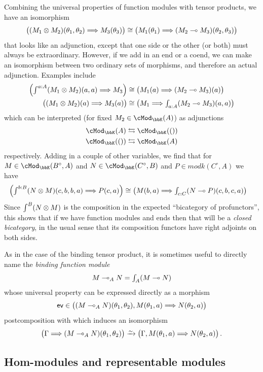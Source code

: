 \documentclass{amsart}
\newcommand{\K}{\bbK}
\let\mod\cMod
\def\modk{\mod_\K}
\renewcommand{\o}{^{\circ}}
\let\vdash\Longrightarrow
\let\mto\vdash    %
\def\mhom#1#2{\left( #1 \vphantom{\big|}\mto #2 \right)}
\newcommand{\coend}{\begingroup\textstyle\int\endgroup}
\newcommand{\tend}{\begingroup\textstyle\int\endgroup}
\newcommand{\ev}{\mathsf{ev}}
\begin{document}
Combining the universal properties of function modules with tensor products, we have an isomorphism
\[ \mhom{(M_1\otimes M_2)(\theta_1,\theta_2)}{M_3(\theta_3)} \cong \mhom{M_1(\theta_1)}{(M_2\multimap M_3)(\theta_2,\theta_3)}
\]
that looks like an adjunction, except that one side or the other (or both) must always be extraordinary.
However, if we add in an end or a coend, we can make an isomorphism between two ordinary sets of morphisms, and therefore an actual adjunction.
Examples include
\begin{align*}
  \mhom{\coend^{a:A} (M_1\otimes M_2)(a,a)}{M_3} &\cong \mhom{M_1(a)}{(M_2\multimap M_3)(a)}\\
  \mhom{(M_1\otimes M_2)(a)}{M_3(a)} &\cong \mhom{M_1}{\tend_{a:A} (M_2\multimap M_3)(a,a)}\\
\end{align*}
which can be interpreted (for fixed $M_2\in \modk(A)$) as adjunctions
\begin{align*}
  \modk(A) &\leftrightarrows \modk(())\\
  \modk(()) &\leftrightarrows \modk(A)
\end{align*}
respectively.
Adding in a couple of other variables, we find that for $M\in \modk(B\o,A)$ and $N\in\modk(C\o,B)$ and $P\in modk(C\o,A)$ we have
\begin{align*}
  \mhom{\coend^{b:B} (N\otimes M)(c,b,b,a)}{P(c,a)} &\cong \mhom{M(b,a)}{\tend_{c:C} (N\multimap P)(c,b,c,a)}
\end{align*}
Since $\coend^B (N\otimes M)$ is the composition in the expected ``bicategory of profunctors'', this shows that if we have function modules and ends then that will be a \emph{closed bicategory}, in the usual sense that its composition functors have right adjoints on both sides.

As in the case of the binding tensor product, it is sometimes useful to directly name the \emph{binding function module}
\[ M\multimap_A N = \tend_A (M\multimap N)\]
whose universal property can be expressed directly as a morphism
\[\ev\in \mhom{(M\multimap_A N)(\theta_1,\theta_2),M(\theta_1,a)}{N(\theta_2,a)}\]
postcomposition with which induces an isomorphism
\[ \mhom{\Gamma}{(M\multimap_A N)(\theta_1,\theta_2)} \toiso
\mhom{\Gamma,M(\theta_1,a)}{N(\theta_2,a)}.
\]


\subsection{Hom-modules and representable modules}
\label{sec:hom}
\end{document}
